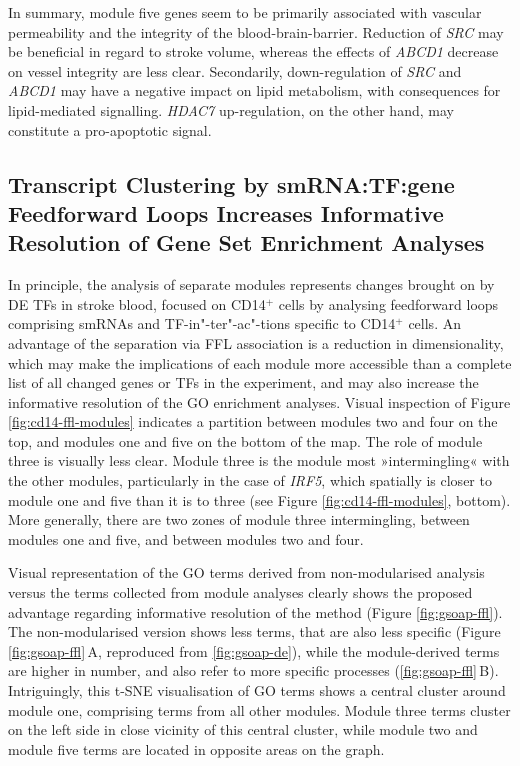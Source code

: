 In summary, module five genes seem to be primarily associated with vascular permeability and the integrity of the blood-brain-barrier. Reduction of \emph{SRC} may be beneficial in regard to stroke volume, whereas the effects of \emph{ABCD1} decrease on vessel integrity are less clear. Secondarily, down-regulation of \emph{SRC} and \emph{ABCD1} may have a negative impact on lipid metabolism, with consequences for lipid-mediated signalling. \emph{HDAC7} up-regulation, on the other hand, may constitute a pro-apoptotic signal.

\subsection{Transcript Clustering by smRNA:TF:gene Feedforward Loops Increases Informative Resolution of Gene Set Enrichment Analyses}
In principle, the analysis of separate modules represents changes brought on by DE TFs in stroke blood, focused on CD14$^+$ cells by analysing feedforward loops comprising smRNAs and TF-in"-ter"-ac"-tions specific to CD14$^+$ cells. An advantage of the separation via FFL association is a reduction in dimensionality, which may make the implications of each module more accessible than a complete list of all changed genes or TFs in the experiment, and may also increase the informative resolution of the GO enrichment analyses. Visual inspection of Figure \ref{fig:cd14-ffl-modules} indicates a partition between modules two and four on the top, and modules one and five on the bottom of the map. The role of module three is visually less clear. Module three is the module most »intermingling« with the other modules, particularly in the case of \emph{IRF5}, which spatially is closer to module one and five than it is to three (see Figure \ref{fig:cd14-ffl-modules}, bottom). More generally, there are two zones of module three intermingling, between modules one and five, and between modules two and four.

Visual representation of the GO terms derived from non-modularised analysis versus the terms collected from module analyses clearly shows the proposed advantage regarding informative resolution of the method (Figure \ref{fig:gsoap-ffl}). The non-modularised version shows less terms, that are also less specific (Figure \ref{fig:gsoap-ffl}\,A, reproduced from \ref{fig:gsoap-de}), while the module-derived terms are higher in number, and also refer to more specific processes (\ref{fig:gsoap-ffl}\,B). Intriguingly, this t-SNE visualisation of GO terms shows a central cluster around module one, comprising terms from all other modules. Module three terms cluster on the left side in close vicinity of this central cluster, while module two and module five terms are located in opposite areas on the graph.

